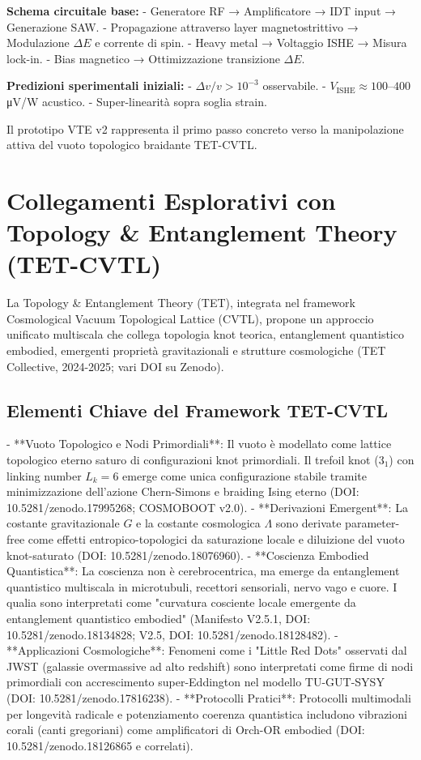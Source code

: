 \documentclass[11pt,a4paper]{article}
\begin{document}
\textbf{Schema circuitale base:}
- Generatore RF → Amplificatore → IDT input → Generazione SAW.
- Propagazione attraverso layer magnetostrittivo → Modulazione $\Delta E$ e corrente di spin.
- Heavy metal → Voltaggio ISHE → Misura lock-in.
- Bias magnetico → Ottimizzazione transizione $\Delta E$.

\textbf{Predizioni sperimentali iniziali:}
- $\Delta v/v > 10^{-3}$ osservabile.
- $V_{\text{ISHE}} \approx 100–400$ μV/W acustico.
- Super-linearità sopra soglia strain.

Il prototipo VTE v2 rappresenta il primo passo concreto verso la manipolazione attiva del vuoto topologico braidante TET-CVTL.


\section{Collegamenti Esplorativi con Topology \& Entanglement Theory (TET-CVTL)}

La Topology \& Entanglement Theory (TET), integrata nel framework Cosmological Vacuum Topological Lattice (CVTL), propone un approccio unificato multiscala che collega topologia knot teorica, entanglement quantistico embodied, emergenti proprietà gravitazionali e strutture cosmologiche (TET Collective, 2024-2025; vari DOI su Zenodo).

\subsection{Elementi Chiave del Framework TET-CVTL}
- **Vuoto Topologico e Nodi Primordiali**: Il vuoto è modellato come lattice topologico eterno saturo di configurazioni knot primordiali. Il trefoil knot ($3_1$) con linking number $L_k=6$ emerge come unica configurazione stabile tramite minimizzazione dell'azione Chern-Simons e braiding Ising eterno (DOI: 10.5281/zenodo.17995268; COSMOBOOT v2.0).
- **Derivazioni Emergent**: La costante gravitazionale $G$ e la costante cosmologica $\Lambda$ sono derivate parameter-free come effetti entropico-topologici da saturazione locale e diluizione del vuoto knot-saturato (DOI: 10.5281/zenodo.18076960).
- **Coscienza Embodied Quantistica**: La coscienza non è cerebrocentrica, ma emerge da entanglement quantistico multiscala in microtubuli, recettori sensoriali, nervo vago e cuore. I qualia sono interpretati come "curvatura cosciente locale emergente da entanglement quantistico embodied" (Manifesto V2.5.1, DOI: 10.5281/zenodo.18134828; V2.5, DOI: 10.5281/zenodo.18128482).
- **Applicazioni Cosmologiche**: Fenomeni come i "Little Red Dots" osservati dal JWST (galassie overmassive ad alto redshift) sono interpretati come firme di nodi primordiali con accrescimento super-Eddington nel modello TU-GUT-SYSY (DOI: 10.5281/zenodo.17816238).
- **Protocolli Pratici**: Protocolli multimodali per longevità radicale e potenziamento coerenza quantistica includono vibrazioni corali (canti gregoriani) come amplificatori di Orch-OR embodied (DOI: 10.5281/zenodo.18126865 e correlati).
\end{document}

